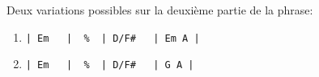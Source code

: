 \tune

Deux variations possibles sur la deuxième partie de la phrase:
\begin{enumerate}
\item \begin{verbatim}
| Em   |  %  | D/F#   | Em A |
\end{verbatim}
\item \begin{verbatim}
| Em   |  %  | D/F#   | G A |
\end{verbatim}
\end{enumerate}
